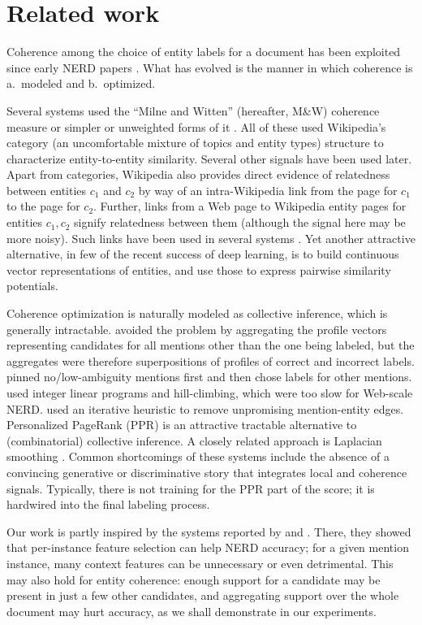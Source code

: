 \section{Related work}
\label{sec:related}

Coherence among the choice of entity labels for a document has been exploited since early NERD papers \cite{Cucerzan07,Milne2008}.  What has evolved is the manner in which coherence is a.~modeled and b.~optimized.

Several systems \cite{Milne2008,KulkarniSRC09,Hoffart2011} used the ``Milne and Witten'' (hereafter, M\&W) coherence measure \cite{Milne2008} or simpler or unweighted forms of it \cite{Cucerzan07}.  All of these used Wikipedia's category (an uncomfortable mixture of topics and entity types) structure to characterize entity-to-entity similarity.  Several other signals have been used later.  Apart from categories, Wikipedia also provides direct evidence of relatedness between entities $c_1$ and $c_2$ by way of an intra-Wikipedia link from the page for $c_1$ to the page for $c_2$.  Further, links from a Web page to Wikipedia entity pages for entities $c_1, c_2$ signify relatedness between them (although the signal here may be more noisy).  Such links have been used in several systems \cite{ChengR13,Chisholm2015}.  Yet another attractive alternative, in few of the recent success of deep learning, is to build continuous vector representations of entities, and use those to express pairwise similarity potentials.

Coherence optimization is naturally modeled as collective inference, which is generally intractable.  \cite{Cucerzan07} avoided the problem by aggregating the profile vectors representing candidates for all mentions other than the one being labeled, but the aggregates were therefore superpositions of profiles of correct and incorrect labels.  \cite{Milne2008} pinned no/low-ambiguity mentions first and then chose labels for other mentions.  \cite{KulkarniSRC2009} used integer linear programs and hill-climbing, which were too slow for Web-scale NERD.  \cite{Hoffart2011} used an iterative heuristic to remove unpromising mention-entity edges.  Personalized PageRank (PPR) \cite{Han11,Pershina2015} is an attractive tractable alternative to (combinatorial) collective inference.  A closely related approach is Laplacian smoothing \cite{Huang2014}.  Common shortcomings of these systems include the absence of a convincing generative or discriminative story that integrates local and coherence signals.  Typically, there is not training for the PPR part of the score; it is hardwired into the final labeling process. 

Our work is partly inspired by the systems reported by \cite{Jin:2014} and \cite{Lazic2015}.  There, they showed that per-instance feature selection can help NERD accuracy; for a given mention instance, many context features can be unnecessary or even detrimental.  This may also hold for entity coherence: enough support for a candidate may be present in just a few other candidates, and aggregating support over the whole document may hurt accuracy, as we shall demonstrate in our experiments.


